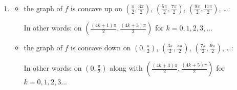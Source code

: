 \documentclass{ximera}
\begin{document}
\begin{enumerate}
\begin{enumerate}
\begin{itemize}
\item $f$ is decreasing on$\left(\frac{\pi}{4}, \frac{5 \pi}{4} \right)$, $\left(\frac{9\pi}{4}, \frac{13 \pi}{4} \right)$, $\left(\frac{17\pi}{4}, \frac{21\pi}{4} \right)$, \ldots : 

In other words:  on $\left( \frac{(8k+1) \pi}{4}, \frac{(8k+5)\pi}{4}\right)$ for $k  = 0, 1, 2, 3 \ldots$

\end{itemize}

\item   \begin{itemize} \item the graph of $f$ is concave up on $\left(\frac{\pi}{2}, \frac{3\pi}{2} \right)$, $\left(\frac{5\pi}{2}, \frac{7 \pi}{2} \right)$, $\left(\frac{9\pi}{2}, \frac{11 \pi}{2} \right)$, \ldots :  

In other words: on  $\left( \frac{(4k+1) \pi}{2}, \frac{(4k+3)\pi}{2}\right)$ for $k = 0,1, 2, 3, \ldots$

\item the graph of $f$ is concave down on  $\left(0, \frac{\pi}{2} \right)$, $\left(\frac{3\pi}{2}, \frac{5 \pi}{2} \right)$, $\left(\frac{7 \pi}{2}, \frac{9\pi}{2} \right)$, \ldots : 

\smallskip

In other words:  on $\left(0, \frac{\pi}{2} \right)$ along with $\left( \frac{(4k+3) \pi}{2}, \frac{(4k+5)\pi}{2}\right)$ for $k  = 0, 1, 2, 3 \ldots$

\end{itemize}

\end{enumerate}


\end{enumerate} 
\end{document}
